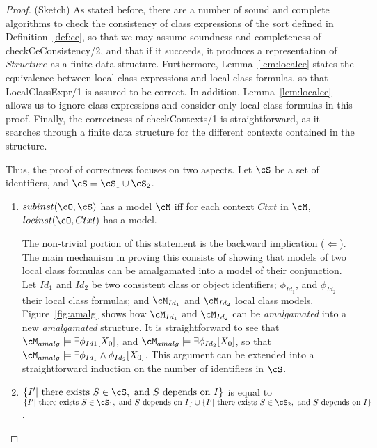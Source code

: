 \begin{proof} (Sketch)
As stated before, there are a number of sound and complete algorithms
to check the consistency of class expressions of the sort defined in
Definition~\ref{def:ce}, so that we may assume soundness and
completeness of {\sf checkCeConsistency/2}, and that if it succeeds,
it produces a representation of $Structure$ as a finite data
structure. Furthermore, Lemma~\ref{lem:localce} states the equivalence
between local class expressions and local class formulas, so that {\sf
LocalClassExpr/1} is assured to be correct.  In addition,
Lemma~\ref{lem:localce} allows us to ignore class expressions and
consider only local class formulas in this proof.  Finally, the
correctness of {\sf checkContexts/1} is straightforward, as it
searches through a finite data structure for the different contexts
contained in the structure.

Thus, the proof of correctness focuses on two aspects.  Let $\cS$ be a
set of identifiers, and $\cS = \cS_1 \cup \cS_2$.
\begin{enumerate}
\item $subinst(\cO,\cS)$ has a model $\cM$ iff for each context $Ctxt$
in $\cM$, $locinst(\cO,Ctxt)$ has a model.

The non-trivial portion of this statement is the backward implication
($\Leftarrow$). The main mechanism in proving this consists of showing
that models of two local class formulas can be amalgamated into a
model of their conjunction.  Let $Id_1$ and $Id_2$ be two consistent
class or object identifiers; $\phi_{Id_1}$, and $\phi_{Id_2}$ their
local class formulas; and $\cM_{Id_1}$ and $\cM_{Id_2}$ local class
models.  Figure~\ref{fig:amalg} shows how $\cM_{Id_1}$ and
$\cM_{Id_2}$ can be {\em amalgamated} into a new {\em amalgamated}
structure.  It is straightforward to see that $\cM_{amalg} \models
\exists \phi_{Id1}[X_0]$, and $\cM_{amalg} \models \exists
\phi_{Id_2}[X_0]$, so that $\cM_{amalg} \models \exists
\phi_{Id_1} \wedge \phi_{Id_2}[X_0]$.  This argument can be extended
into a straightforward induction on the number of identifiers in
$\cS$.

\item $\{ I' | \mbox{ there exists } S \in \cS, \mbox{ and } S
\mbox{ depends on } I\}$ is equal to $\{ I' | \mbox{ there exists } S
\in \cS_1, \mbox{ and } S \mbox{ depends on } I\} \cup \{ I' | \mbox{
there exists } S \in \cS_2, \mbox{ and } S \mbox{ depends on } I\}$.

\end{enumerate}
\end{proof}

